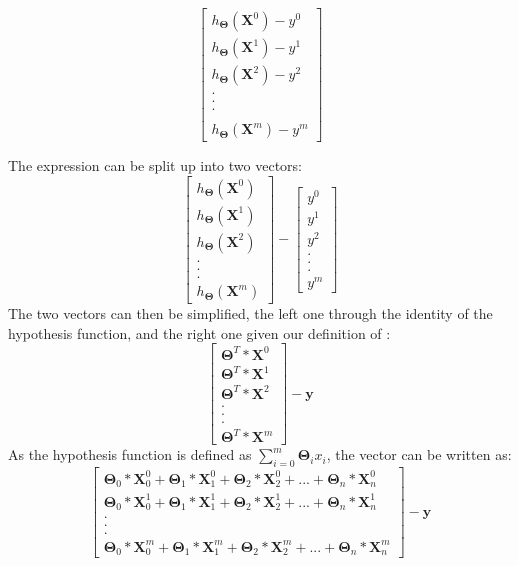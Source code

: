 \documentclass[a4paper,12pt]{article}
\begin{document}
\[\begin{bmatrix} h_{\boldsymbol{\Theta}} (\boldsymbol{X}^0) - y^0 \\ h_{\boldsymbol{\Theta}} (\boldsymbol{X}^1) - y^1 \\ h_{\boldsymbol{\Theta}} (\boldsymbol{X}^2) - y^2 \\ . \\ . \\ . \\  \\ h_{\boldsymbol{\Theta}} (\boldsymbol{X}^m) - y^m\end{bmatrix}\]

The expression can be split up into two vectors: 
\[\begin{bmatrix} h_{\boldsymbol{\Theta}} (\boldsymbol{X}^0) \\ h_{\boldsymbol{\Theta}} (\boldsymbol{X}^1) \\ h_{\boldsymbol{\Theta}} (\boldsymbol{X}^2) \\ . \\ . \\ . \\ h_{\boldsymbol{\Theta}} (\boldsymbol{X}^m) \end{bmatrix} - \begin{bmatrix} y^0 \\ y^1 \\ y^2 \\ . \\ . \\ . \\ y^m \end{bmatrix}\]
The two vectors can then be simplified, the left one through the identity of the hypothesis function, and the right one given our definition of \unboldmath:
\[\begin{bmatrix} \boldsymbol{\Theta}^T * \boldsymbol{X}^0 \\ \boldsymbol{\Theta}^T * \boldsymbol{X}^1 \\ \boldsymbol{\Theta}^T * \boldsymbol{X}^2 \\ . \\ . \\ . \\ \boldsymbol{\Theta}^T * \boldsymbol{X}^m \end{bmatrix} - \boldsymbol{y}\]
As the hypothesis function is defined as \(\sum_{i=0}^m \boldsymbol{\Theta}_i x_i\), the vector can be written as:
\[\begin{bmatrix} \boldsymbol{\Theta}_0 * \boldsymbol{X}_0^0 + \boldsymbol{\Theta}_1 * \boldsymbol{X}_1^0 + \boldsymbol{\Theta}_2 * \boldsymbol{X}_2^0 + ... + \boldsymbol{\Theta}_n * \boldsymbol{X}_n^0 \\ \boldsymbol{\Theta}_0 * \boldsymbol{X}_0^1 + \boldsymbol{\Theta}_1 * \boldsymbol{X}_1^1 + \boldsymbol{\Theta}_2 * \boldsymbol{X}_2^1 + ... + \boldsymbol{\Theta}_n * \boldsymbol{X}_n^1 \\ . \\ . \\ . \\ \boldsymbol{\Theta}_0 * \boldsymbol{X}_0^m + \boldsymbol{\Theta}_1 * \boldsymbol{X}_1^m + \boldsymbol{\Theta}_2 * \boldsymbol{X}_2^m + ... + \boldsymbol{\Theta}_n * \boldsymbol{X}_n^m \end{bmatrix} - \boldsymbol{y}\]
\end{document}

